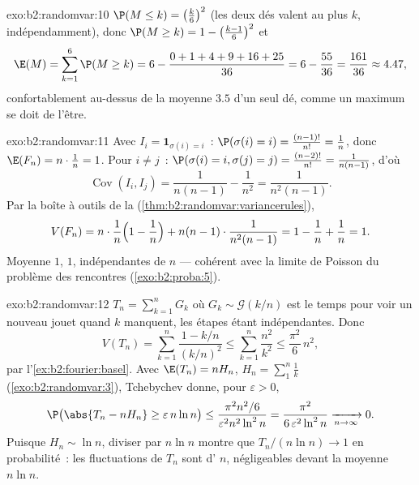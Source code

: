 \begin{solution}{exo:b2:randomvar:10}
$\P(M \leq k) = \bigl(\frac k6\bigr)^2$ (les deux dés valent au plus
$k$, indépendamment), donc $\P(M \geq k) = 1 -
\bigl(\frac{k-1}6\bigr)^2$ et
\[
\E(M) = \sum_{k=1}^6\P(M \geq k)
= 6 - \frac{0 + 1 + 4 + 9 + 16 + 25}{36}
= 6 - \frac{55}{36} = \frac{161}{36} \approx 4.47 ,
\]
confortablement au-dessus de la moyenne $3.5$ d'un seul dé, comme un
maximum se doit de l'être.
\end{solution}

\begin{solution}{exo:b2:randomvar:11}
Avec $I_i = \mathbf 1_{\sigma(i) = i}$~: $\P(\sigma(i) = i) =
\frac{(n-1)!}{n!} = \frac1n$, donc $\E(F_n) = n\cdot\frac1n =
1$. Pour $i \neq j$~: $\P(\sigma(i) = i, \sigma(j) = j) =
\frac{(n-2)!}{n!} = \frac1{n(n-1)}$, d'où
\[
\operatorname{Cov}(I_i, I_j) = \frac1{n(n-1)} - \frac1{n^2}
= \frac{1}{n^2(n-1)} .
\]
Par la boîte à outils de la 
(\cref{thm:b2:randomvar:variancerules}),
\[
V(F_n) = n\cdot\frac1n\Bigl(1 - \frac1n\Bigr)
+ n(n-1)\cdot\frac1{n^2(n-1)}
= 1 - \frac1n + \frac1n = 1 .
\]
Moyenne $1$,  $1$, indépendantes de $n$ --- cohérent
avec la limite de Poisson du problème des rencontres
(\cref{exo:b2:proba:5}).
\end{solution}

\begin{solution}{exo:b2:randomvar:12}
$T_n = \sum_{k=1}^nG_k$ où $G_k \sim \mathcal G(k/n)$ est
le temps pour voir un nouveau jouet quand $k$ manquent, les étapes
étant indépendantes. Donc
\[
V(T_n) = \sum_{k=1}^n\frac{1 - k/n}{(k/n)^2}
\leq \sum_{k=1}^n\frac{n^2}{k^2}
\leq \frac{\pi^2}6\,n^2 ,
\]
par l'\cref{ex:b2:fourier:basel}. Avec $\E(T_n) = nH_n$, $H_n =
\sum_1^n\frac1k$ (\cref{exo:b2:randomvar:3}), Tchebychev donne,
pour $\varepsilon > 0$,
\[
\P\bigl(\abs{T_n - nH_n} \geq \varepsilon\,n\ln n\bigr)
\leq \frac{\pi^2n^2/6}{\varepsilon^2n^2\ln^2 n}
= \frac{\pi^2}{6\,\varepsilon^2\ln^2n}
\xrightarrow[n\to\infty]{} 0 .
\]
Puisque $H_n \sim \ln n$, diviser par $n\ln n$ montre que
$T_n/(n\ln n) \to 1$ en probabilité~: les fluctuations de
$T_n$ sont d' $n$, négligeables devant la moyenne $n\ln n$.
\end{solution}

